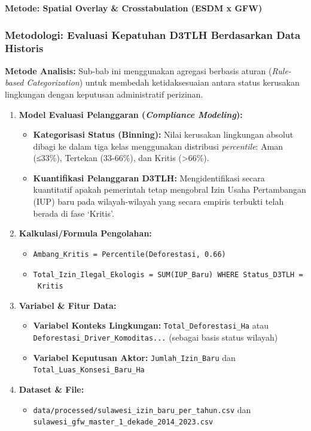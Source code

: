 \documentclass[
]{article}
\providecommand{\tightlist}{%
  \setlength{\itemsep}{0pt}\setlength{\parskip}{0pt}}
\begin{document}
\textbf{Metode: Spatial Overlay \& Crosstabulation (ESDM x GFW)}

\subsubsection{Metodologi: Evaluasi Kepatuhan D3TLH Berdasarkan Data
Historis}\label{metodologi-evaluasi-kepatuhan-d3tlh-berdasarkan-data-historis}

\textbf{Metode Analisis:} Sub-bab ini menggunakan agregasi berbasis
aturan (\emph{Rule-based Categorization}) untuk membedah ketidaksesuaian
antara status kerusakan lingkungan dengan keputusan administratif
perizinan.

\begin{enumerate}
\def\labelenumi{\arabic{enumi}.}
\tightlist
\item
  \textbf{Model Evaluasi Pelanggaran (\emph{Compliance Modeling}):}

  \begin{itemize}
  \tightlist
  \item
    \textbf{Kategorisasi Status (Binning):} Nilai kerusakan lingkungan
    absolut dibagi ke dalam tiga kelas menggunakan distribusi
    \emph{percentile}: Aman (≤33\%), Tertekan (33-66\%), dan Kritis
    (\textgreater66\%).
  \item
    \textbf{Kuantifikasi Pelanggaran D3TLH:} Mengidentifikasi secara
    kuantitatif apakah pemerintah tetap mengobral Izin Usaha
    Pertambangan (IUP) baru pada wilayah-wilayah yang secara empiris
    terbukti telah berada di fase `Kritis'.
  \end{itemize}
\item
  \textbf{Kalkulasi/Formula Pengolahan:}

  \begin{itemize}
  \tightlist
  \item
    \texttt{Ambang\_Kritis\ =\ Percentile(Deforestasi,\ 0.66)}
  \item
    \texttt{Total\_Izin\_Ilegal\_Ekologis\ =\ SUM(IUP\_Baru)\ WHERE\ Status\_D3TLH\ =\ \textquotesingle{}Kritis\textquotesingle{}}
  \end{itemize}
\item
  \textbf{Variabel \& Fitur Data:}

  \begin{itemize}
  \tightlist
  \item
    \textbf{Variabel Konteks Lingkungan:}
    \texttt{Total\_Deforestasi\_Ha} atau
    \texttt{Deforestasi\_Driver\_Komoditas...} (sebagai basis status
    wilayah)
  \item
    \textbf{Variabel Keputusan Aktor:} \texttt{Jumlah\_Izin\_Baru} dan
    \texttt{Total\_Luas\_Konsesi\_Baru\_Ha}
  \end{itemize}
\item
  \textbf{Dataset \& File:}

  \begin{itemize}
  \tightlist
  \item
    \texttt{data/processed/sulawesi\_izin\_baru\_per\_tahun.csv} dan
    \texttt{sulawesi\_gfw\_master\_1\_dekade\_2014\_2023.csv}
  \end{itemize}
\end{enumerate}
\end{document}
